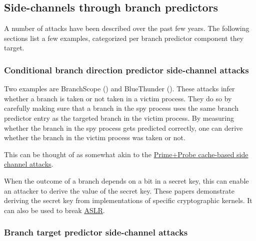 \documentclass[
  a4paper,
]{report}
\begin{document}
\subsection{Side-channels through branch
predictors}\label{side-channels-through-branch-predictors}

A number of attacks have been described over the past few years. The
following sections list a few examples, categorized per branch predictor
component they target.

\subsubsection{Conditional branch direction predictor side-channel
attacks}\label{conditional-branch-direction-predictor-side-channel-attacks}

\label{__index_entry_151}{}

Two examples are
\label{__index_entry_152}{BranchScope}
() and
\label{__index_entry_153}{BlueThunder}
(). These attacks infer whether a
branch is taken or not taken in a victim process. They do so by
carefully making sure that a branch in the spy process uses the same
branch predictor entry as the targeted branch in the victim process. By
measuring whether the branch in the spy process gets predicted
correctly, one can derive whether the branch in the victim process was
taken or not.

This can be thought of as somewhat akin to the
\hyperref[primeprobe]{Prime+Probe cache-based side channel attacks}.

When the outcome of a branch depends on a bit in a secret key, this can
enable an attacker to derive the value of the secret key. These papers
demonstrate deriving the secret key from implementations of specific
cryptographic kernels. It can also be used to break
\hyperref[aslr]{\label{__index_entry_154}{ASLR}}.

\subsubsection{Branch target predictor side-channel
attacks}\label{branch-target-predictor-side-channel-attacks}

\label{__index_entry_155}{}
\end{document}
